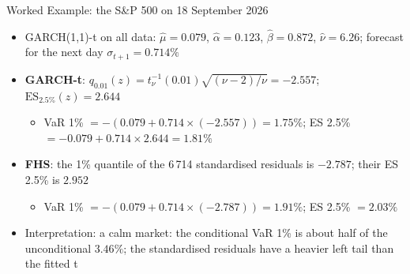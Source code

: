 \begin{frame}{Worked Example: the S\&P 500 on 18 September 2026}
\itemsize{\footnotesize}
\begin{itemize}
    \item GARCH(1,1)-t on all data: $\hat\mu = 0.079$, $\hat\alpha = 0.123$, $\hat\beta = 0.872$, $\hat\nu = 6.26$; forecast for the next day $\sigma_{t+1} = 0.714\%$
    \item \textbf{GARCH-t}: $q_{0.01}(z) = t_\nu^{-1}(0.01)\sqrt{(\nu - 2)/\nu} = -2.557$; $\mathrm{ES}_{2.5\%}(z) = 2.644$
    \begin{itemize}
        \item VaR 1\% $= -(0.079 + 0.714 \times (-2.557)) = 1.75\%$; ES 2.5\% $= -0.079 + 0.714 \times 2.644 = 1.81\%$
    \end{itemize}
    \item \textbf{FHS}: the 1\% quantile of the 6\,714 standardised residuals is $-2.787$; their ES 2.5\% is $2.952$
    \begin{itemize}
        \item VaR 1\% $= -(0.079 + 0.714 \times (-2.787)) = 1.91\%$; ES 2.5\% $= 2.03\%$
    \end{itemize}
    \item Interpretation: a calm market: the conditional VaR 1\% is about half of the unconditional $3.46\%$; the standardised residuals have a heavier left tail than the fitted t
\end{itemize}
\end{frame}

